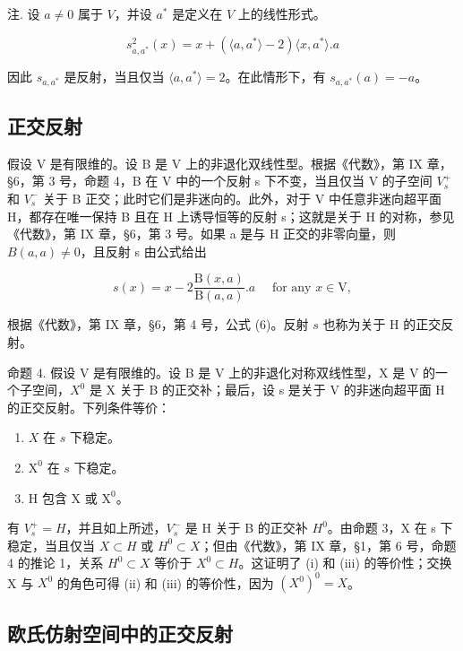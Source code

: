 注. 设 \(a \neq 0\) 属于 \(V\)，并设 \(a^*\) 是定义在 \(V\) 上的线性形式。

\[
s _ {a, a ^ {*}} ^ {2} (x) = x + \left(\langle a, a ^ {*} \rangle - 2\right) \langle x, a ^ {*} \rangle . a
\]

因此 \(s_{a,a^*}\) 是反射，当且仅当 \(\langle a, a^* \rangle = 2\)。在此情形下，有 \(s_{a,a^*}(a) = -a\)。

\subsection{正交反射}

假设 V 是有限维的。设 B 是 V 上的非退化双线性型。根据《代数》，第 IX 章，§6，第 3 号，命题 4，B 在 V 中的一个反射 s 下不变，当且仅当 V 的子空间 \(V_{s}^{+}\) 和 \(V_{s}^{-}\) 关于 B 正交；此时它们是非迷向的。此外，对于 V 中任意非迷向超平面 H，都存在唯一保持 B 且在 H 上诱导恒等的反射 s；这就是关于 H 的对称，参见《代数》，第 IX 章，§6，第 3 号。如果 a 是与 H 正交的非零向量，则 \(B(a,a)\neq0\)，且反射 s 由公式给出

\[
s (x) = x - 2 \frac {\mathrm{B} (x , a)}{\mathrm{B} (a , a)}. a \quad \text { for   any } x \in \mathrm{V},\tag{4}
\]

根据《代数》，第 IX 章，§6，第 4 号，公式 (6)。反射 \(s\) 也称为关于 H 的正交反射。

命题 4. 假设 V 是有限维的。设 B 是 V 上的非退化对称双线性型，X 是 V 的一个子空间，\(X^{0}\) 是 X 关于 B 的正交补；最后，设 s 是关于 V 的非迷向超平面 H 的正交反射。下列条件等价：

\begin{enumerate}
\def\labelenumi{(\roman{enumi})}
\item
  \(X\) 在 \(s\) 下稳定。
\item
  \(\mathrm{X}^0\) 在 \(s\) 下稳定。
\item
  H 包含 X 或 \(\mathrm{X}^0\)。
\end{enumerate}

有 \(V_{s}^{+} = H\)，并且如上所述，\(V_{s}^{-}\) 是 H 关于 B 的正交补 \(H^{0}\)。由命题 3，X 在 s 下稳定，当且仅当 \(X \subset H\) 或 \(H^{0} \subset X\)；但由《代数》，第 IX 章，§1，第 6 号，命题 4 的推论 1，关系 \(H^{0} \subset X\) 等价于 \(X^{0} \subset H\)。这证明了 (i) 和 (iii) 的等价性；交换 X 与 \(X^{0}\) 的角色可得 (ii) 和 (iii) 的等价性，因为 \((X^{0})^{0} = X\)。

\subsection{欧氏仿射空间中的正交反射}

